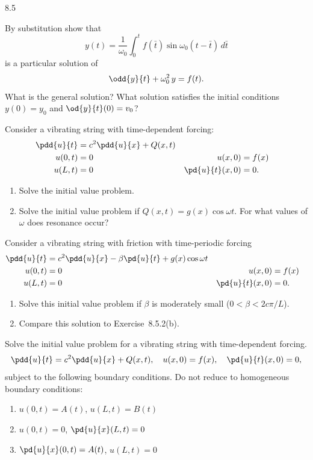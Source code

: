 \begin{exercises}{8.5}

\item By substitution show that
\[
y(t) = \frac{1}{\omega_0}\int_0^t f(\bar{t})\sin\omega_0(t-\bar{t})\,d\bar{t}
\]
is a particular solution of
\[
\odd{y}{t} + \omega_0^2\,y = f(t).
\]
What is the general solution?  What solution satisfies the initial conditions $y(0) = y_0$ and $\od{y}{t}(0) = v_0$?

\item Consider a vibrating string with time-dependent forcing:
\begin{alignat*}{2}
\pdd{u}{t} &= c^2\pdd{u}{x} + Q(x,t) \\
u(0,t) &= 0 \qquad& u(x,0) &= f(x) \\
u(L,t) &= 0 & \pd{u}{t}(x,0) &= 0.
\end{alignat*}
\begin{enumerate}
\item[(a)] Solve the initial value problem.
\item[\starred(b)] Solve the initial value problem if $Q(x,t) = g(x)\cos\omega t$.  For what values of $\omega$ does resonance occur?
\end{enumerate}

\item Consider a vibrating string with friction with time-periodic forcing
\begin{alignat*}{2}
\pdd{u}{t} &= c^2\pdd{u}{x} - \beta\pd{u}{t} + g(x)\cos\omega t \\
u(0,t) &= 0 \qquad& u(x,0) &= f(x) \\
u(L,t) &= 0 & \pd{u}{t}(x,0) &= 0.
\end{alignat*}
\begin{enumerate}
\item[(a)] Solve this initial value problem if $\beta$ is moderately small ($0 < \beta < 2c\pi/L$).
\item[(b)] Compare this solution to Exercise~8.5.2(b).
\end{enumerate}

\item Solve the initial value problem for a vibrating string with time-dependent forcing.
\[
\pdd{u}{t} = c^2\pdd{u}{x} + Q(x,t),\quad u(x,0) = f(x),\quad \pd{u}{t}(x,0) = 0,
\]
subject to the following boundary conditions.  Do not reduce to homogeneous boundary conditions:
\begin{enumerate}
\item[(a)] $u(0,t) = A(t)$, \quad $u(L,t) = B(t)$
\item[(b)] $u(0,t) = 0$, \quad $\pd{u}{x}(L,t) = 0$
\item[(c)] $\pd{u}{x}(0,t) = A(t)$, \quad $u(L,t) = 0$
\end{enumerate}


\end{exercises}
